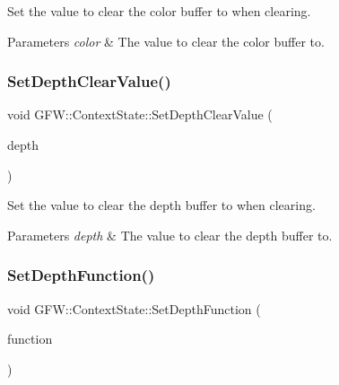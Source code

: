 Set the value to clear the color buffer to when clearing. 


\begin{DoxyParams}{Parameters}
{\em color} & The value to clear the color buffer to. \\
\hline
\end{DoxyParams}
\mbox{\label{class_g_f_w_1_1_context_state_a1c4e031a0199eea45a508f54b4c1e774}} 
\subsubsection{\texorpdfstring{Set\+Depth\+Clear\+Value()}{SetDepthClearValue()}}
{\footnotesize\ttfamily void G\+F\+W\+::\+Context\+State\+::\+Set\+Depth\+Clear\+Value (\begin{DoxyParamCaption}\item[{float}]{depth }\end{DoxyParamCaption})}



Set the value to clear the depth buffer to when clearing. 


\begin{DoxyParams}{Parameters}
{\em depth} & The value to clear the depth buffer to. \\
\hline
\end{DoxyParams}
\mbox{\label{class_g_f_w_1_1_context_state_aa0d4ecd0d061a53edb09a30e5b8142eb}} 
\subsubsection{\texorpdfstring{Set\+Depth\+Function()}{SetDepthFunction()}}
{\footnotesize\ttfamily void G\+F\+W\+::\+Context\+State\+::\+Set\+Depth\+Function (\begin{DoxyParamCaption}\item[{\hyperlink{namespace_g_f_w_a2eabb5a646179bceaab2d5e3bfce2316}{Test\+Function}}]{function }\end{DoxyParamCaption})}



